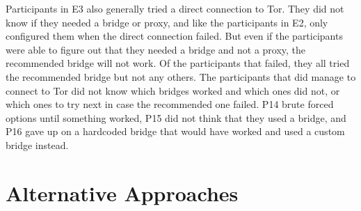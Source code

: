 \documentclass[USenglish,oneside,twocolumn]{article}
\begin{document}
Participants in E3 also generally tried a direct connection to Tor. They did not know if they needed a bridge or proxy, and like the participants in E2, only configured them when the direct connection failed. But even if the participants were able to figure out that they needed a bridge and not a proxy, the recommended bridge will not work. Of the participants that failed, they all tried the recommended bridge but not any others. The participants that did manage to connect to Tor did not know which bridges worked and which ones did not, or which ones to try next in case the recommended one failed. P14 brute forced options until something worked, P15 did not think that they used a bridge, and P16 gave up on a hardcoded bridge that would have worked and used a custom bridge instead.

\section{Alternative Approaches} 
\label{alternatives}
\end{document}
